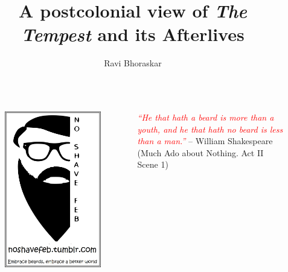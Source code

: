 \documentclass{beamer}
\title[The Tempest \hspace{15em} \insertframenumber / \inserttotalframenumber]{A postcolonial view of \emph{The Tempest} and its Afterlives}
\author {Ravi Bhoraskar}
\begin{document}
\begin{frame}[plain]
  \begin{columns}[c]
    \begin{figure}[htp]
      \begin{center}
        \centering
        \includegraphics[scale=0.17]{../Presentation/nsf.jpg}
      \end{center}
    \end{figure}
    \textcolor{red}{\emph{``He that hath a beard is more than a youth, and he that hath no beard is less than a man.''}}
-- William Shakespeare (Much Ado about Nothing. Act II Scene 1)
  \end{columns}
  
\end{frame}
\end{document}
